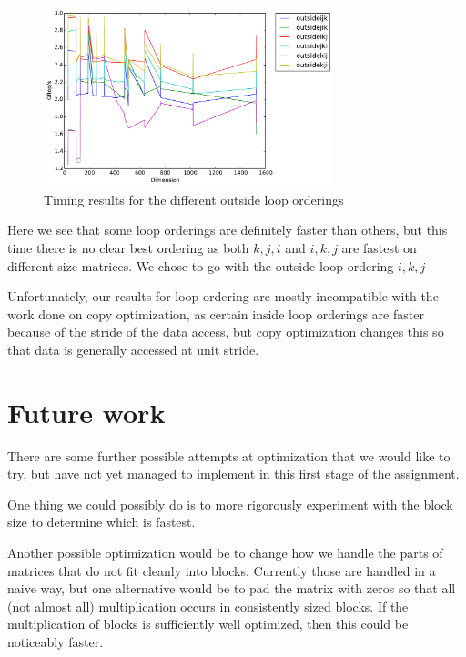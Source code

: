 \documentclass[11pt]{amsart}
\begin{document}
\begin{figure}[hh]
\includegraphics[width=0.75\textwidth]{timing_outsideloops.pdf}
\caption{Timing results for the different outside loop orderings}
\end{figure}

Here we see that some loop orderings are definitely faster than others, but this time there is no clear best ordering as both $k,j,i$ and $i,k,j$ are fastest on different size matrices. We chose to go with the outside loop ordering $i,k,j$

Unfortunately, our results for loop ordering are mostly incompatible with the work done on copy optimization, as certain inside loop orderings are faster because of the stride of the data access, but copy optimization changes this so that data is generally accessed at unit stride.

\section*{Future work}
There are some further possible attempts at optimization that we would like to try, but have not yet managed to implement in this first stage of the assignment.

One thing we could possibly do is to more rigorously experiment with the block size to determine which is fastest.

Another possible optimization would be to change how we handle the parts of matrices that do not fit cleanly into blocks. Currently those are handled in a naive way, but one alternative would be to pad the matrix with zeros so that all (not almost all) multiplication occurs in consistently sized blocks. If the multiplication of blocks is sufficiently well optimized, then this could be noticeably faster.
\end{document}
